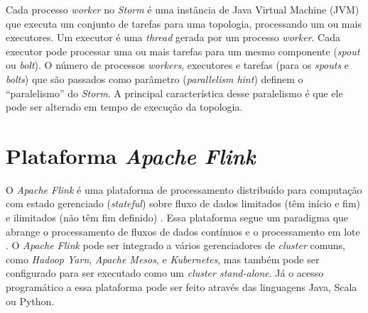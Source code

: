 Cada processo \emph{worker} no \emph{Storm} é uma instância de Java Virtual Machine (JVM)
que executa um conjunto de tarefas para uma topologia, processando um ou mais
executores.
Um executor é uma \emph{thread} gerada por um processo \emph{worker}.
Cada executor pode processar uma ou mais tarefas para um mesmo componente
(\emph{spout} ou \emph{bolt}).
O número de processos \emph{workers}, executores e tarefas (para os
\emph{spouts} e \emph{bolts}) que são passados como parâmetro (\emph{parallelism
hint}) definem o ``paralelismo'' do \emph{Storm}. A principal característica desse
paralelismo é que ele pode ser alterado em tempo de execução da topologia.






\section{Plataforma \emph{Apache Flink}}

O \emph{Apache Flink} é uma plataforma de processamento distribuído para
computação com estado gerenciado (\emph{stateful}) sobre fluxo de dados limitados (têm início e
fim) e ilimitados (não têm fim definido) \cite{ApacheFlink2020}.
Essa plataforma segue um paradigma que abrange o processamento de fluxos de
dados contínuos e o processamento em lote \cite{Carbone2015,Lopez2018}.
O \emph{Apache Flink} pode ser integrado a vários gerenciadores de \emph{cluster}
comuns, como \emph{Hadoop Yarn}, \emph{Apache Mesos}, e \emph{Kubernetes}, mas também pode ser
configurado para ser executado como um \emph{cluster stand-alone}.
Já o acesso programático a essa plataforma pode ser feito através das linguagens
Java, Scala ou Python.


